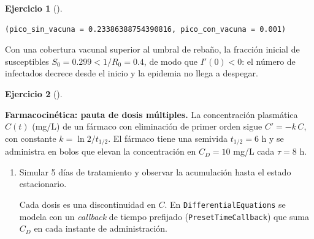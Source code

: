 \documentclass[
  spanish,
  a4paper,
]{scrreport}
\theoremstyle{definition}
\newtheorem{exercise}{Ejercicio}[chapter]
\theoremstyle{remark}
\begin{document}
\begin{exercise}[]
\begin{enumerate}
\begin{tcolorbox}
\begin{verbatim}
(pico_sin_vacuna = 0.23386388754390816, pico_con_vacuna = 0.001)
\end{verbatim}

  Con una cobertura vacunal superior al umbral de rebaño, la fracción
  inicial de susceptibles \(S_0 = 0.299 < 1/R_0 = 0.4\), de modo que
  \(I'(0) < 0\): el número de infectados decrece desde el inicio y la
  epidemia no llega a despegar.

  \end{tcolorbox}
\end{enumerate}

\end{exercise}

\begin{exercise}[]\protect\hypertarget{exr-farmacocinetica-dosis}{}\label{exr-farmacocinetica-dosis}

\textbf{Farmacocinética: pauta de dosis múltiples.} La concentración
plasmática \(C(t)\) (mg/L) de un fármaco con eliminación de primer orden
sigue \(C' = -k\,C\), con constante \(k = \ln 2 / t_{1/2}\). El fármaco
tiene una semivida \(t_{1/2} = 6\) h y se administra en bolos que elevan
la concentración en \(C_D = 10\) mg/L cada \(\tau = 8\) h.

\begin{enumerate}
\def\labelenumi{\alph{enumi}.}
\item
  Simular 5 días de tratamiento y observar la acumulación hasta el
  estado estacionario.

  \begin{tcolorbox}[enhanced jigsaw, arc=.35mm, bottomrule=.15mm, bottomtitle=1mm, breakable, colback=white, colbacktitle=quarto-callout-note-color!10!white, colframe=quarto-callout-note-color-frame, coltitle=black, left=2mm, leftrule=.75mm, opacityback=0, opacitybacktitle=0.6, rightrule=.15mm, title=\textcolor{quarto-callout-note-color}{\faInfo}\hspace{0.5em}{Ayuda}, titlerule=0mm, toprule=.15mm, toptitle=1mm]

  Cada dosis es una discontinuidad en \(C\). En
  \texttt{DifferentialEquations} se modela con un \emph{callback} de
  tiempo prefijado (\texttt{PresetTimeCallback}) que suma \(C_D\) en
  cada instante de administración.

  \end{tcolorbox}

  \begin{tcolorbox}[enhanced jigsaw, arc=.35mm, bottomrule=.15mm, bottomtitle=1mm, breakable, colback=white, colbacktitle=quarto-callout-tip-color!10!white, colframe=quarto-callout-tip-color-frame, coltitle=black, left=2mm, leftrule=.75mm, opacityback=0, opacitybacktitle=0.6, rightrule=.15mm, title=\textcolor{quarto-callout-tip-color}{\faLightbulb}\hspace{0.5em}{Solución}, titlerule=0mm, toprule=.15mm, toptitle=1mm]


\end{tcolorbox}
\end{enumerate}
\end{exercise}
\end{document}
